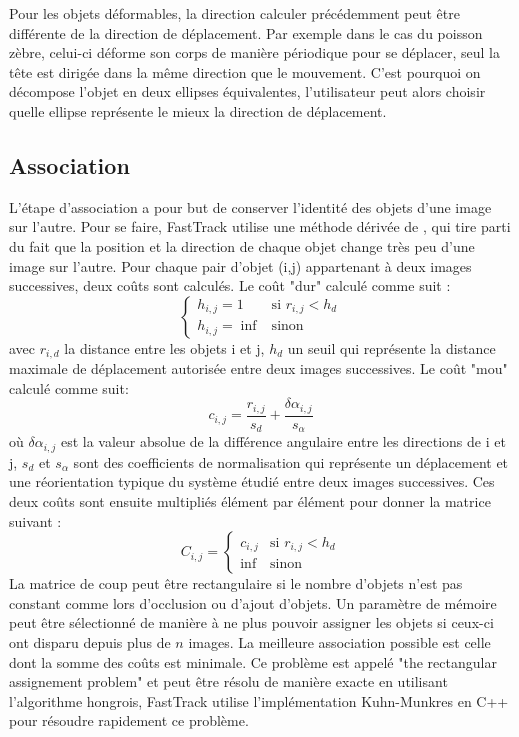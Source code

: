		Pour les objets déformables, la direction calculer précédemment peut être différente de la direction de déplacement. Par exemple dans le cas du poisson zèbre, celui-ci déforme son corps de manière périodique pour se déplacer, seul la tête est dirigée dans la même direction que le mouvement. C'est pourquoi on décompose l'objet en deux ellipses équivalentes, l'utilisateur peut alors choisir quelle ellipse représente le mieux la direction de déplacement.
		
		
		\subsection{Association}
		
		L'étape d'association a pour but de conserver l'identité des objets d'une image sur l'autre. Pour se faire, FastTrack utilise une méthode dérivée de \cite{}, qui tire parti du fait que la position et la direction de chaque objet change très peu d'une image sur l'autre.
		Pour chaque pair d'objet (i,j) appartenant à deux images successives, deux coûts sont calculés.
		Le coût "dur" calculé comme suit :
        $$
        \left\{
        	\begin{array}{ll}
        		h_{i,j} = 1 & \mbox{si } r_{i,j} < h_{d} \\
        		h_{i,j} = \inf & \mbox{sinon }
        	\end{array}
        \right.       
        $$
        avec $r_{i,d}$ la distance entre les objets i et j, $h_{d}$ un seuil qui représente la distance maximale de déplacement autorisée entre deux images successives.
		Le coût "mou" calculé comme suit:
		$$
        c_{i,j} = \frac{r_{i,j}}{s_d} + \frac{\delta\alpha_{i,j}}{s_{\alpha}}		
		$$
		où $\delta\alpha_{i,j}$ est la valeur absolue de la différence angulaire entre les directions de i et j, $s_{d}$ et $s_{\alpha}$ sont des coefficients de normalisation qui représente un déplacement et une réorientation typique du système étudié entre deux images successives.
		Ces deux coûts sont ensuite multipliés élément par élément pour donner la matrice suivant :
		$$
        C_{i,j} = \left\{
        	\begin{array}{ll}
        		c_{i,j} & \mbox{si } r_{i,j} < h_{d} \\
        		\inf & \mbox{sinon }
        	\end{array}
        \right.       
        $$
		La matrice de coup peut être rectangulaire si le nombre d'objets n'est pas constant comme lors d'occlusion ou d'ajout d'objets. Un paramètre de mémoire peut être sélectionné de manière à ne plus pouvoir assigner les objets si ceux-ci ont disparu depuis plus de $n$ images.
		La meilleure association possible est celle dont la somme des coûts est minimale. Ce problème est appelé "the rectangular assignement problem" et peut être résolu de manière exacte en utilisant l’algorithme hongrois, FastTrack utilise l'implémentation Kuhn-Munkres en C++ pour résoudre rapidement ce problème.
		
